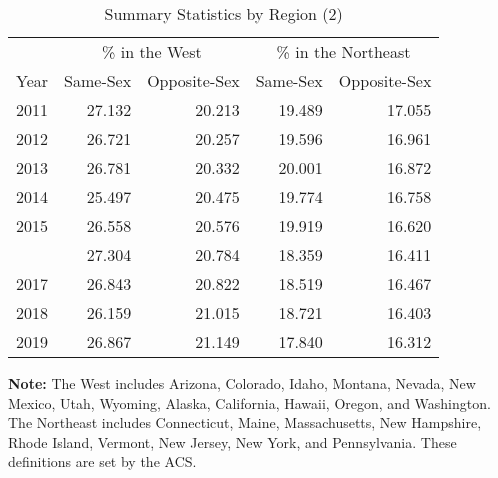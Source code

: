 \begin{table}[h]

\caption{Summary Statistics by Region (2)}
\label{region_2} %
\centering
\begin{tabular}[t]{rrrrr}
\toprule
\multicolumn{1}{c}{ } & \multicolumn{2}{c}{\% in the West} & \multicolumn{2}{c}{\% in the Northeast} \\
\cmidrule(l{3pt}r{3pt}){2-3} \cmidrule(l{3pt}r{3pt}){4-5}
Year & Same-Sex & Opposite-Sex & Same-Sex & Opposite-Sex\\
\midrule
2011 & 27.132 & 20.213 & 19.489 & 17.055\\
2012 & 26.721 & 20.257 & 19.596 & 16.961\\
2013 & 26.781 & 20.332 & 20.001 & 16.872\\
2014 & 25.497 & 20.475 & 19.774 & 16.758\\
2015 & 26.558 & 20.576 & 19.919 & 16.620\\
\addlinespace
2016 & 27.304 & 20.784 & 18.359 & 16.411\\
2017 & 26.843 & 20.822 & 18.519 & 16.467\\
2018 & 26.159 & 21.015 & 18.721 & 16.403\\
2019 & 26.867 & 21.149 & 17.840 & 16.312\\
\bottomrule
\end{tabular}
\vspace{0.5em}
\begin{minipage}{0.85\textwidth} %
\small \textbf{Note:} The West includes Arizona, Colorado, Idaho, Montana, Nevada, New Mexico, Utah, Wyoming, Alaska, California, Hawaii, Oregon, and Washington. The Northeast includes Connecticut, Maine, Massachusetts, New Hampshire, Rhode Island, Vermont, New Jersey, New York, and Pennsylvania. These definitions are set by the ACS.
\end{minipage}
\end{table}
